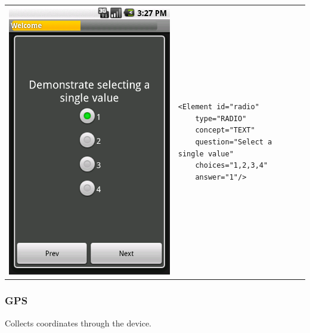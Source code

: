 \documentclass[a4paper,10pt]{article}
\begin{document}
\noindent\begin{tabular}{ p{3.5cm}  p{7.5cm} }
\includegraphics[scale=0.2,keepaspectratio=true]{client_radio.png}
& \begin{verbatim}
<Element id="radio"
    type="RADIO"  
    concept="TEXT"  
    question="Select a single value"  
    choices="1,2,3,4"
    answer="1"/>\end{verbatim}
\end{tabular}

\subsubsection{GPS} Collects coordinates through the device.
\end{document}
